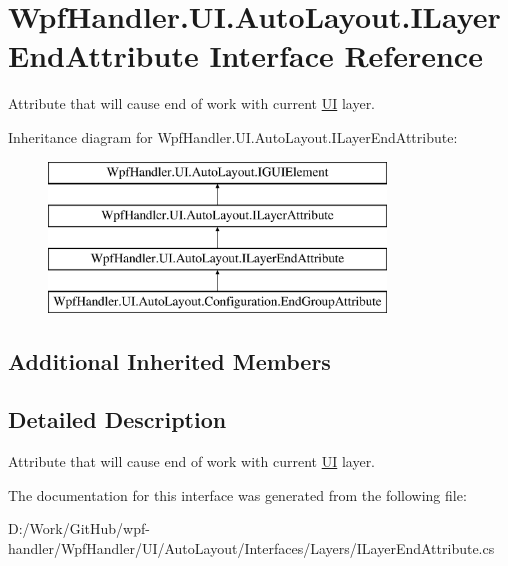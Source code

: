\hypertarget{interface_wpf_handler_1_1_u_i_1_1_auto_layout_1_1_i_layer_end_attribute}{}\section{Wpf\+Handler.\+U\+I.\+Auto\+Layout.\+I\+Layer\+End\+Attribute Interface Reference}
\label{interface_wpf_handler_1_1_u_i_1_1_auto_layout_1_1_i_layer_end_attribute}


Attribute that will cause end of work with current \mbox{\hyperlink{namespace_wpf_handler_1_1_u_i}{UI}} layer.  


Inheritance diagram for Wpf\+Handler.\+U\+I.\+Auto\+Layout.\+I\+Layer\+End\+Attribute\+:\begin{figure}[H]
\begin{center}
\leavevmode
\includegraphics[height=4.000000cm]{df/d01/interface_wpf_handler_1_1_u_i_1_1_auto_layout_1_1_i_layer_end_attribute}
\end{center}
\end{figure}
\subsection*{Additional Inherited Members}


\subsection{Detailed Description}
Attribute that will cause end of work with current \mbox{\hyperlink{namespace_wpf_handler_1_1_u_i}{UI}} layer. 



The documentation for this interface was generated from the following file\+:\begin{DoxyCompactItemize}
\item 
D\+:/\+Work/\+Git\+Hub/wpf-\/handler/\+Wpf\+Handler/\+U\+I/\+Auto\+Layout/\+Interfaces/\+Layers/I\+Layer\+End\+Attribute.\+cs\end{DoxyCompactItemize}
